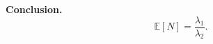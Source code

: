 \documentclass[a4paper,12pt]{article}
\begin{document}
\begin{itemize}
\medskip
\noindent
\textbf{Conclusion.}
\[
\boxed{\mathbb{E}[N] = \frac{\lambda_1}{\lambda_2}.}
\]
\end{itemize}



\begin{center}
\end{center}
\end{document}
